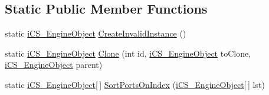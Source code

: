 \subsection*{Static Public Member Functions}
\begin{DoxyCompactItemize}
\item 
static \hyperlink{classi_c_s___engine_object}{i\+C\+S\+\_\+\+Engine\+Object} \hyperlink{classi_c_s___engine_object_aeb146d8b4f94cf54209bdafbd170ae37}{Create\+Invalid\+Instance} ()
\item 
static \hyperlink{classi_c_s___engine_object}{i\+C\+S\+\_\+\+Engine\+Object} \hyperlink{classi_c_s___engine_object_a9cf60586b217b75b6de81045f1937d4b}{Clone} (int id, \hyperlink{classi_c_s___engine_object}{i\+C\+S\+\_\+\+Engine\+Object} to\+Clone, \hyperlink{classi_c_s___engine_object}{i\+C\+S\+\_\+\+Engine\+Object} parent)
\item 
static \hyperlink{classi_c_s___engine_object}{i\+C\+S\+\_\+\+Engine\+Object}\mbox{[}$\,$\mbox{]} \hyperlink{classi_c_s___engine_object_a604602094121ea7dd8520a8f9614971a}{Sort\+Ports\+On\+Index} (\hyperlink{classi_c_s___engine_object}{i\+C\+S\+\_\+\+Engine\+Object}\mbox{[}$\,$\mbox{]} lst)
\end{DoxyCompactItemize}
